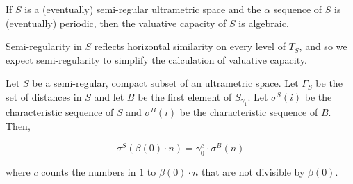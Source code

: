 \begin{corollary*}
If $S$ is a (eventually) semi-regular ultrametric space and the $\alpha$ sequence of $S$ is (eventually)  periodic, then the valuative capacity of $S$ is algebraic.
\end{corollary*}



Semi-regularity in $S$ reflects horizontal similarity on every level of $T_S$, and so we expect semi-regularity to simplify the calculation of valuative capacity.

\begin{proposition*}
Let $S$ be a semi-regular, compact subset of an ultrametric space. Let $\Gamma_S$ be the set of distances in $S$ and let $B$ be the first element of $S_{\gamma_1}$. Let $\sigma^S(i)$  be the characteristic sequence of $S$ and $\sigma^B(i)$ be the characteristic sequence of $B$. Then,

\[\sigma^S(\beta(0) \cdot n)=\gamma_0^c \cdot \sigma^{B}(n)\]

where $c$ counts the numbers in $1$ to $\beta(0) \cdot n$ that are not divisible by $\beta(0)$.

\end{proposition*}

